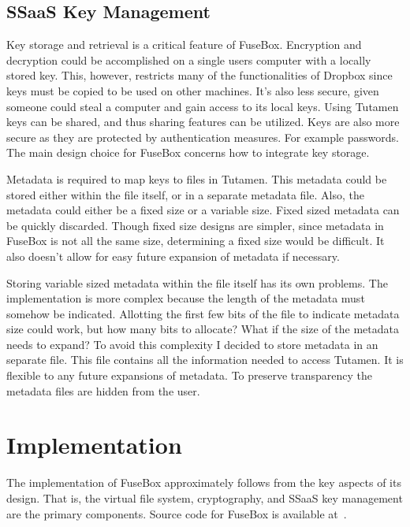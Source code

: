 \documentclass[11pt,twocolumn,letterpaper]{article}
\newcommand{\appname}{FuseBox }
\newcommand{\appnameWOspace}{FuseBox}
\newcommand{\custos}{Tutamen }
\newcommand{\custosWOspace}{Tutamen}
\begin{document}
\subsection{SSaaS Key Management}
\label{sec:keystorage}
Key storage and retrieval is a critical feature of \appnameWOspace. 
Encryption and decryption could be accomplished on a single users
computer with a locally stored key. This, however, restricts many of the
functionalities of Dropbox since keys must be copied to be used on
other machines. It's also less secure, given someone could
steal a computer and gain access to its local keys.
Using \custos keys can be shared, and thus 
sharing features can be utilized. Keys are also more secure as they
are protected by authentication measures. For example passwords.  
The main design choice for \appname
concerns how to integrate key storage.  
\par Metadata is required to map keys to files in \custosWOspace. This
metadata could be stored either within the file itself, or in a
separate metadata file. Also, the metadata could either be a fixed size or a
variable size. Fixed sized metadata can be quickly discarded. Though
fixed size designs are simpler, since metadata in \appname is not all the same size,
determining a fixed size would be difficult. It also doesn't allow for
easy future expansion of metadata if necessary. 
\par Storing variable sized metadata within the file itself has its
own problems. The implementation is more complex because the length of the
metadata must somehow be indicated. Allotting the first few bits of the
file to indicate metadata size could work, but how many bits to
allocate? What if the size of the metadata needs to expand?
To avoid this complexity I decided to store metadata in an separate file. This
file contains all the information needed to access \custosWOspace. It
is flexible to any future expansions of metadata. 
To preserve transparency the metadata files are hidden from the user. 

\section{Implementation}
\label{sec:implementation}
The implementation of \appname approximately follows from the key aspects
of its design. That is, the virtual file system, cryptography, and
SSaaS key management
are the primary components. Source code for \appname is available at~\cite{FuseBox}.
\end{document}
